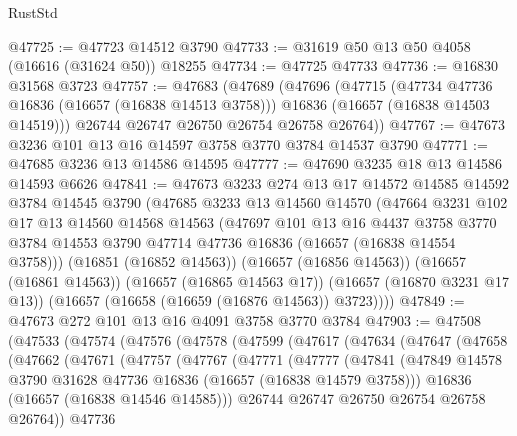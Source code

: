 \begin{lexlean}{RustStd}
\begin{coremodule}
@47725 := @47723 @14512 @3790
@47733 := @31619 @50 @13 @50 @4058 (@16616 (@31624 @50)) @18255
@47734 := @47725 @47733
@47736 := @16830 @31568 @3723
@47757 := @47683
    (@47689
      (@47696
        (@47715
          (@47734 @47736 @16836 (@16657 (@16838 @14513 @3758)))
          @16836
          (@16657 (@16838 @14503 @14519)))
        @26744
        @26747
        @26750
        @26754
        @26758
        @26764))
@47767 := @47673 @3236 @101 @13 @16 @14597 @3758 @3770 @3784 @14537 @3790
@47771 := @47685 @3236 @13 @14586 @14595
@47777 := @47690 @3235 @18 @13 @14586 @14593 @6626
@47841 := @47673
    @3233
    @274
    @13
    @17
    @14572
    @14585
    @14592
    @3784
    @14545
    @3790
    (@47685
      @3233
      @13
      @14560
      @14570
      (@47664
        @3231
        @102
        @17
        @13
        @14560
        @14568
        @14563
        (@47697
          @101
          @13
          @16
          @4437
          @3758
          @3770
          @3784
          @14553
          @3790
          @47714
          @47736
          @16836
          (@16657 (@16838 @14554 @3758)))
        (@16851 (@16852 @14563))
        (@16657 (@16856 @14563))
        (@16657 (@16861 @14563))
        (@16657 (@16865 @14563 @17))
        (@16657 (@16870 @3231 @17 @13))
        (@16657 (@16658 (@16659 (@16876 @14563)) @3723))))
@47849 := @47673 @272 @101 @13 @16 @4091 @3758 @3770 @3784
@47903 := @47508
    (@47533
      (@47574
        (@47576
          (@47578
            (@47599
              (@47617
                (@47634
                  (@47647
                    (@47658
                      (@47662
                        (@47671
                          (@47757
                            (@47767
                              (@47771
                                (@47777
                                  (@47841
                                    (@47849
                                      @14578
                                      @3790
                                      @31628
                                      @47736
                                      @16836
                                      (@16657 (@16838 @14579 @3758)))
                                    @16836
                                    (@16657 (@16838 @14546 @14585)))
                                  @26744
                                  @26747
                                  @26750
                                  @26754
                                  @26758
                                  @26764))
                              @47736

\end{coremodule}
\end{lexlean}
